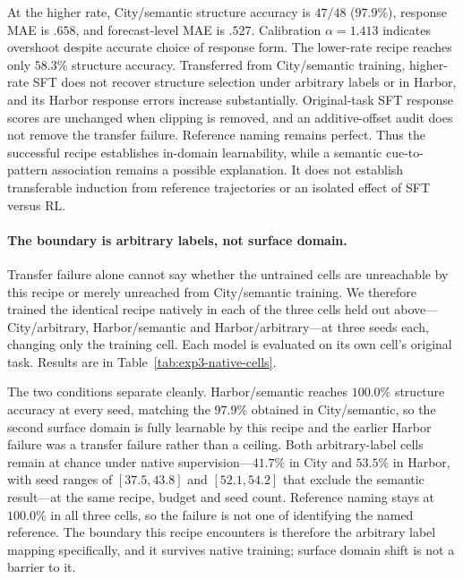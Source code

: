 At the higher rate, City/semantic structure accuracy is $47/48$ ($97.9\%$),
response MAE is $.658$, and forecast-level MAE is $.527$. Calibration
$\alpha=1.413$ indicates overshoot despite accurate choice of response form.
The lower-rate recipe reaches only $58.3\%$ structure accuracy. Transferred
from City/semantic training, higher-rate SFT does not recover structure
selection under arbitrary labels or in Harbor, and its Harbor response errors
increase substantially. Original-task SFT response scores are unchanged when
clipping is removed, and an additive-offset audit does not remove the transfer
failure. Reference naming remains perfect. Thus the successful recipe
establishes in-domain learnability, while a semantic cue-to-pattern
association remains a possible explanation. It does not establish transferable
induction from reference trajectories or an isolated effect of SFT versus RL.

\paragraph{The boundary is arbitrary labels, not surface domain.}
Transfer failure alone cannot say whether the untrained cells are unreachable
by this recipe or merely unreached from City/semantic training. We therefore
trained the identical recipe natively in each of the three cells held out
above---City/arbitrary, Harbor/semantic and Harbor/arbitrary---at three seeds
each, changing only the training cell. Each model is evaluated on its own
cell's original task. Results are in
Table~\ref{tab:exp3-native-cells}.

The two conditions separate cleanly. Harbor/semantic reaches $100.0\%$
structure accuracy at every seed, matching the $97.9\%$ obtained in
City/semantic, so the second surface domain is fully learnable by this recipe
and the earlier Harbor failure was a transfer failure rather than a ceiling.
Both arbitrary-label cells remain at chance under native supervision---$41.7\%$
in City and $53.5\%$ in Harbor, with seed ranges of $[37.5,43.8]$ and
$[52.1,54.2]$ that exclude the semantic result---at the same recipe, budget
and seed count. Reference naming stays at $100.0\%$ in all three cells, so the
failure is not one of identifying the named reference. The boundary this
recipe encounters is therefore the arbitrary label mapping specifically, and
it survives native training; surface domain shift is not a barrier to it.

\begin{table}[htbp]
\centering\small
\setlength{\tabcolsep}{4pt}

\caption{\textbf{Native training separates the label condition from the
surface domain.} The higher-rate SFT recipe trained in each cell and evaluated
on that cell's original task, averaged over seeds 42--44. Seed range is the
minimum and maximum structure accuracy across those seeds. Name is
selection-only reference identification. Harbor is learnable under semantic
labels; neither arbitrary-label cell exceeds chance.}
\label{tab:exp3-native-cells}
\end{table}


